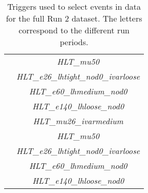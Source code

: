 \documentclass[NOTE, atlasdraft=true, texlive=2017, UKenglish]{\ATLASLATEXPATH atlasdoc}
\begin{document}
\begin{table}[!htbp]
{\begin{center}
\begin{tabular}{|c|c|}
        & \emph{HLT\_mu50}\\
        & \emph{HLT\_e26\_lhtight\_nod0\_ivarloose}\\
        & \emph{HLT\_e60\_lhmedium\_nod0}\\
        & \emph{HLT\_e140\_lhloose\_nod0}\\
        \hline
        \multirow{2}{*}{\parbox[t]{2mm}{}} & \emph{HLT\_mu26\_ivarmedium}\\
        & \emph{HLT\_mu50}\\
        & \emph{HLT\_e26\_lhtight\_nod0\_ivarloose}\\
        & \emph{HLT\_e60\_lhmedium\_nod0}\\
        & \emph{HLT\_e140\_lhloose\_nod0}\\
        \hline
      \end{tabular}
      \caption{Triggers used to select events in data for the full Run 2 dataset. The letters correspond to the different run periods.}
      \label{tab:triggers}
  \end{center}}
\end{table}
\end{document}
